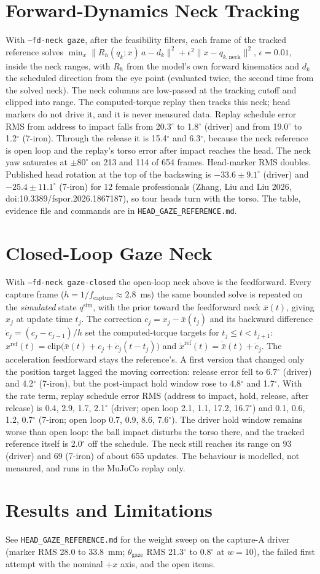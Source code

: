 \documentclass[11pt]{article}
\begin{document}
\section{Forward-Dynamics Neck Tracking}
With \texttt{--fd-neck gaze}, after the feasibility filters, each frame of the tracked
reference solves
$\min_{x} \lVert R_h(q_k; x)\, a - d_k \rVert^2 + \epsilon^2 \lVert x - q_{k,\mathrm{neck}} \rVert^2$,
$\epsilon = 0.01$, inside the neck ranges, with $R_h$ from the model's own forward
kinematics and $d_k$ the scheduled direction from the eye point (evaluated twice, the
second time from the solved neck). The neck columns are low-passed at the tracking cutoff
and clipped into range. The computed-torque replay then tracks this neck; head markers do
not drive it, and it is never measured data. Replay schedule error RMS from address to
impact falls from 20.3$^\circ$ to 1.8$^\circ$ (driver) and from 19.0$^\circ$ to
1.2$^\circ$ (7-iron). Through the release it is 15.4$^\circ$ and 6.3$^\circ$, because the
neck reference is open loop and the replay's torso error after impact reaches the head.
The neck yaw saturates at $\pm 80^\circ$ on 213 and 114 of 654 frames. Head-marker RMS
doubles. Published head rotation at the top of the backswing is
$-33.6 \pm 9.1^\circ$ (driver) and $-25.4 \pm 11.1^\circ$ (7-iron) for 12 female
professionals (Zhang, Liu and Liu 2026, doi:10.3389/fspor.2026.1867187), so tour heads
turn with the torso. The table, evidence file and commands are in
\texttt{HEAD\_GAZE\_REFERENCE.md}.
\section{Closed-Loop Gaze Neck}
With \texttt{--fd-neck gaze-closed} the open-loop neck above is the feedforward. Every
capture frame ($h = 1/f_{\mathrm{capture}} \approx 2.8$~ms) the same bounded solve is
repeated on the \emph{simulated} state $q^{\mathrm{sim}}$, with the prior toward the
feedforward neck $\bar{x}(t)$, giving $x_j$ at update time $t_j$. The correction
$c_j = x_j - \bar{x}(t_j)$ and its backward difference $\dot{c}_j = (c_j - c_{j-1})/h$
set the computed-torque targets for $t_j \le t < t_{j+1}$:
$x^{\mathrm{ref}}(t) = \mathrm{clip}\bigl(\bar{x}(t) + c_j + \dot{c}_j (t - t_j)\bigr)$ and
$\dot{x}^{\mathrm{ref}}(t) = \dot{\bar{x}}(t) + \dot{c}_j$. The acceleration feedforward
stays the reference's. A first version that changed only the position target lagged the
moving correction: release error fell to 6.7$^\circ$ (driver) and 4.2$^\circ$ (7-iron),
but the post-impact hold window rose to 4.8$^\circ$ and 1.7$^\circ$. With the rate term,
replay schedule error RMS (address to impact, hold, release, after release) is
0.4, 2.9, 1.7, 2.1$^\circ$ (driver; open loop 2.1, 1.1, 17.2, 16.7$^\circ$) and
0.1, 0.6, 1.2, 0.7$^\circ$ (7-iron; open loop 0.7, 0.9, 8.6, 7.6$^\circ$). The driver
hold window remains worse than open loop: the ball impact disturbs the torso there, and the
tracked reference itself is 2.0$^\circ$ off the schedule. The neck still reaches its range
on 93 (driver) and 69 (7-iron) of about 655 updates. The behaviour is modelled, not
measured, and runs in the MuJoCo replay only.
\section{Results and Limitations}
See \texttt{HEAD\_GAZE\_REFERENCE.md} for the weight sweep on the capture-A driver
(marker RMS 28.0 to 33.8~mm; $\theta_{\mathrm{gaze}}$ RMS 21.3$^\circ$ to 0.8$^\circ$ at $w = 10$),
the failed first attempt with the nominal $+x$ axis, and the open items.
\end{document}
